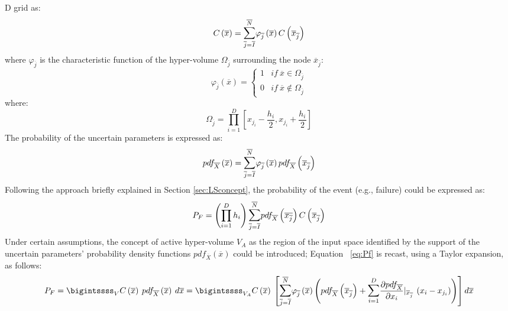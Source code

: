 D grid as:
\begin{equation}
C\left ( \overline{x} \right ) = 
\mathlarger{\sum}_{\overline{j}=\overline{I}}^{\overline{N}} \varphi_{\overline{j}}\left 
( \overline{x} \right ) C\left ( \overline{x}_{\overline{j}} \right )
\end{equation}
where $\varphi_{\overline{j}}$ is the characteristic function of the hyper-volume $\Omega_{\overline{j}}$ surrounding the node 
 $\overline{x}_{\overline{j}}$:
 \begin{equation}
 \varphi_{\overline{j}}\left ( \overline{x} \right ) = 
\left\{\begin{matrix}
1 & if \: \overline{x} \in \Omega_{\overline{j}} \\ 
0 & if \: \overline{x} \notin \Omega_{\overline{j}} 
\end{matrix}\right.
\end{equation}
where:
 \begin{equation}
 \label{eq:OmegaEq}
 \Omega_{\overline{j}} = \prod_{i=1}^{D}\left [ x_{j_{i}} - \frac{h_{i}}{2}, 
 x_{j_{i}} + \frac{h_{i}}{2}  \right ]
 \end{equation}
 The probability of the uncertain parameters is expressed as:
 \begin{equation} 
 pdf_{\overline{X}}\left ( \overline{x} \right ) = 
\mathlarger{\sum}_{\overline{j}=\overline{I}}^{\overline{N}}
\varphi_{\overline{j}}\left ( \overline{x} \right )
pdf_{\overline{X}}\left ( \overline{x}_{\overline{j}} \right )
 \end{equation}
Following the approach briefly explained in Section 
\ref{sec:LSconcept}, the probability of the event (e.g., failure) could be 
expressed as: 
 \begin{equation} 
 \label{eq:Pf}
  P_{F}=\left ( \prod_{i=1}^{D}h_{i} \right ) 
  \mathlarger{\sum}_{\overline{j}=
  \overline{I}}^{\overline{N}}pdf_{\overline{X}}\left ( 
  \overline{x_{\overline{j}}} \right )
  C\left ( \overline{x}_{\overline{j}} \right )
 \end{equation}
Under certain assumptions, the concept of active hyper-volume 
$V_{A}$ as the region of the input space identified by the support of 
the uncertain parameters’ probability density functions 
$pdf_{\overline{X}}\left ( \overline{x} \right )$ could be introduced; 
Equation ~\ref{eq:Pf} is recast, using a Taylor expansion, as follows: 
 \begin{equation} 
P_{F}= \bigintssss_{V} C\left ( \overline{x} \right )\: pdf_{\overline{X}}\left ( 
\overline{x}  \right )\: d\overline{x} =\bigintssss_{V_{A}}C\left ( \overline{x} 
\right )\: 
\left [  
\mathlarger{\sum}_{\overline{j}=\overline{I}}^{\overline{N}}\varphi_{\overline{j}}\left ( 
\overline{x} \right )
\left ( pdf_{\overline{X}}\left ( \overline{x}_{\overline{j}} \right ) +
\mathlarger{\sum}_{i=1}^{D} \frac{\partial pdf_{\overline{X}}}{\partial x_{i}}|
_{\overline{x}_{\overline{j}}} \: \left ( x_{i} - x_{j_{i}} \right ) \right ) \right 
] d\overline{x}
 \end{equation}
